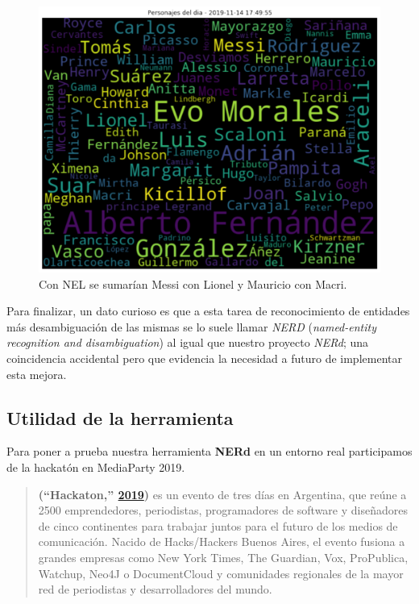 \documentclass[12pt,a4paper,]{scrartcl}
\begin{document}
\begin{figure}[H]

{\centering \includegraphics{assets/LosPersonajesDelDia.pdf} 

}

\caption{Con NEL se sumarían Messi con Lionel y Mauricio con Macri.}\label{fig:fig-cloud}
\end{figure}

Para finalizar, un dato curioso es que a esta tarea de reconocimiento de entidades más desambiguación de las mismas se lo suele llamar \emph{NERD} (\emph{named-entity recognition and disambiguation}) al igual que nuestro proyecto \emph{NERd}; una coincidencia accidental pero que evidencia la necesidad a futuro de implementar esta mejora.

\hypertarget{utilidad-de-la-herramienta}{%
\subsection{Utilidad de la herramienta}\label{utilidad-de-la-herramienta}}

Para poner a prueba nuestra herramienta \textbf{NERd} en un entorno real participamos de la hackatón en MediaParty 2019.

\begin{quote}
\textbf{(``Hackaton,'' \protect\hyperlink{ref-hackaton2019}{2019})} es un evento de tres días en Argentina, que reúne a 2500 emprendedores, periodistas, programadores de software y diseñadores de cinco continentes para trabajar juntos para el futuro de los medios de comunicación.
Nacido de Hacks/Hackers Buenos Aires, el evento fusiona a grandes empresas como New York Times, The Guardian, Vox, ProPublica, Watchup, Neo4J o DocumentCloud y comunidades regionales de la mayor red de periodistas y desarrolladores del mundo.
\end{quote}
\end{document}
